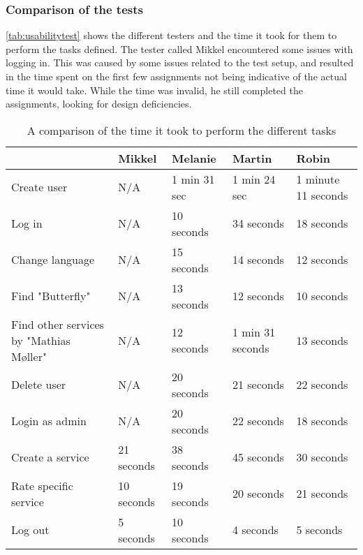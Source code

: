 \subsubsection{Comparison of the tests}
\autoref{tab:usabilitytest} shows the different testers and the time it took for them to perform the tasks defined.
The tester called Mikkel encountered some issues with logging in.
This was caused by some issues related to the test setup, and resulted in the time spent on the first few assignments not being indicative of the actual time it would take.
While the time was invalid, he still completed the assignments, looking for design deficiencies.
\begin{table}[]
    \begin{tabular}{|l|l|l|l|l|}
    \hline
                                            & Mikkel     & Melanie      & Martin           & Robin               \\ \hline
    Create user                             & N/A        & 1 min 31 sec & 1 min 24 sec     & 1 minute 11 seconds \\ \hline
    Log in                                  & N/A        & 10 seconds   & 34 seconds       & 18 seconds          \\ \hline
    Change language                         & N/A        & 15 seconds   & 14 seconds       & 12 seconds          \\ \hline
    Find "Butterfly"                        & N/A        & 13 seconds   & 12 seconds       & 10 seconds          \\ \hline
    Find other services by "Mathias Møller" & N/A        & 12 seconds   & 1 min 31 seconds & 13 seconds          \\ \hline
    Delete user                             & N/A        & 20 seconds   & 21 seconds       & 22 seconds          \\ \hline
    Login as admin                          & N/A        & 20 seconds   & 22 seconds       & 18 seconds          \\ \hline
    Create a service                        & 21 seconds & 38 seconds   & 45 seconds       & 30 seconds          \\ \hline
    Rate specific service                   & 10 seconds & 19 seconds   & 20 seconds       & 21 seconds          \\ \hline
    Log out                                 & 5 seconds  & 10 seconds   & 4 seconds        & 5 seconds           \\ \hline
    \end{tabular}
    \caption{A comparison of the time it took to perform the different tasks}
    \label{tab:usabilitytest}
\end{table}
